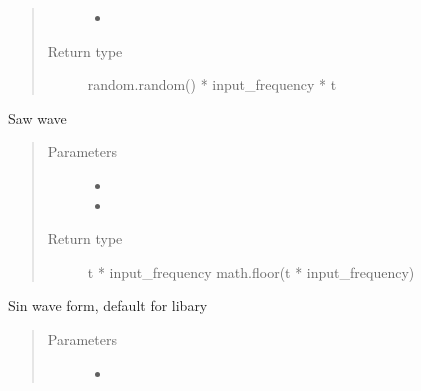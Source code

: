 \documentclass[letterpaper,10pt,english]{sphinxmanual}
\begin{document}
\begin{fulllineitems}
\begin{fulllineitems}
\begin{quote}
\begin{description}
\begin{itemize}
\item {} 
\sphinxAtStartPar
{} \textendash{} 

\end{itemize}

\item[{Return type}] \leavevmode
\sphinxAtStartPar
random.random() * input\_frequency * t

\end{description}\end{quote}

\end{fulllineitems}


\begin{fulllineitems}
\label{\detokenize{audio:audio.wave_table.saw}}
\pysigstartsignatures
{}
\pysigstopsignatures
\sphinxAtStartPar
Saw wave
\begin{quote}\begin{description}
\item[{Parameters}] \leavevmode\begin{itemize}
\item {} 
\sphinxAtStartPar
{} \textendash{} 

\item {} 
\sphinxAtStartPar
{} \textendash{} 

\end{itemize}

\item[{Return type}] \leavevmode
\sphinxAtStartPar
t * input\_frequency \sphinxhyphen{} math.floor(t * input\_frequency)

\end{description}\end{quote}

\end{fulllineitems}


\begin{fulllineitems}
\label{\detokenize{audio:audio.wave_table.sin}}
\pysigstartsignatures
{}
\pysigstopsignatures
\sphinxAtStartPar
Sin wave form, default for libary
\begin{quote}\begin{description}
\item[{Parameters}] \leavevmode\begin{itemize}
\item {} 
\sphinxAtStartPar
{} \textendash{} 


\end{itemize}
\end{description}
\end{quote}
\end{fulllineitems}
\end{fulllineitems}
\end{document}
